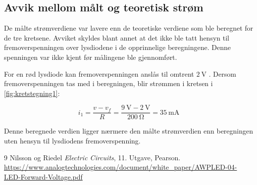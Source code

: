 \documentclass[11pt,a4paper,twocolumn]{article}
\begin{document}
\subsection{Avvik mellom målt og teoretisk strøm} 

De målte strømverdiene var lavere enn de teoretiske verdiene som ble
beregnet for de tre kretsene. Avviket skyldes blant annet at det ikke
ble tatt hensyn til fremoverspenningen over lysdiodene i de opprinnelige
beregningene. Denne spenningen var ikke kjent før målingene ble
gjennomført.

For en rød lysdiode kan fremoverspenningen anslås til omtrent
$\qty{2}{\volt}$ \cite{analogtech}. Dersom fremoverspenningen tas med i
beregningen, blir strømmen i kretsen i \cref{fig:kretstegning1}:

$$
i_1 = \frac{v - v_f}{R} = \frac{\qty{9}{\volt} - \qty{2}{\volt}}{\qty{200}{\ohm}} = \qty{35}{\milli\ampere}
$$

Denne beregnede verdien ligger nærmere den målte strømverdien enn
beregningen uten hensyn til lysdiodens fremoverspenning.

\begin{thebibliography}{9}
Nilsson og Riedel \textit{Electric Circuits}, 11. Utgave, Pearson.
\url{https://www.analogtechnologies.com/document/white_paper/AWPLED-04-LED-Forward-Voltage.pdf}
\end{thebibliography}
\end{document}
